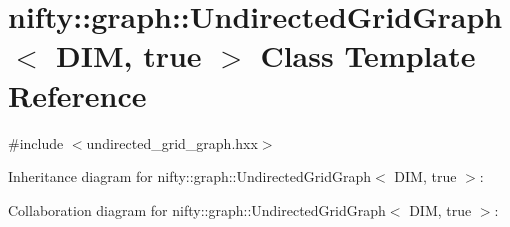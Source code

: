 \hypertarget{classnifty_1_1graph_1_1UndirectedGridGraph_3_01DIM_00_01true_01_4}{}\section{nifty\+:\+:graph\+:\+:Undirected\+Grid\+Graph$<$ D\+I\+M, true $>$ Class Template Reference}
\label{classnifty_1_1graph_1_1UndirectedGridGraph_3_01DIM_00_01true_01_4}


{\ttfamily \#include $<$undirected\+\_\+grid\+\_\+graph.\+hxx$>$}



Inheritance diagram for nifty\+:\+:graph\+:\+:Undirected\+Grid\+Graph$<$ D\+I\+M, true $>$\+:


Collaboration diagram for nifty\+:\+:graph\+:\+:Undirected\+Grid\+Graph$<$ D\+I\+M, true $>$\+:
